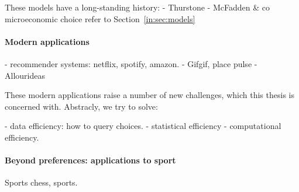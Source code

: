 These models have a long-standing history:
- Thurstone
- McFadden \& co microeconomic choice
refer to Section~\ref{in:sec:models}

\paragraph{Modern applications}

- recommender systems: netflix, spotify, amazon.
- Gifgif, place pulse
- Allourideas

These modern applications raise a number of new challenges, which this thesis is concerned with.
Abstracly, we try to solve:

- data efficiency: how to query choices.
- statistical efficiency
- computational efficiency.

\paragraph{Beyond preferences: applications to sport}
Sports chess, sports.



